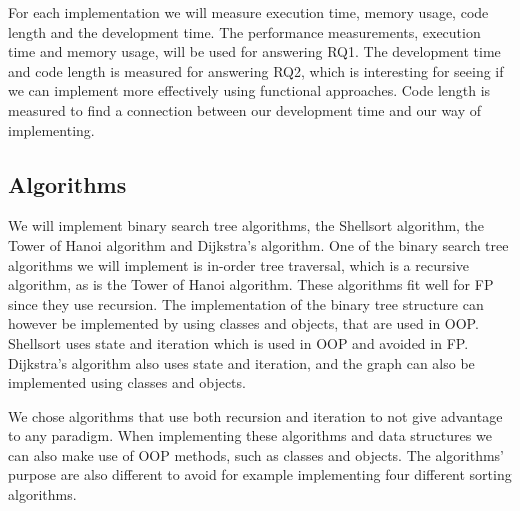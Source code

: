 \documentclass {article}
\begin{document}
For each implementation we will measure execution time, memory usage, code length and the development time. The performance measurements, execution time and memory usage, will be used for answering RQ1. The development time and code length is measured for answering RQ2, which is interesting for seeing if we can implement more effectively using functional approaches. Code length is measured to find a connection between our development time and our way of implementing.
\subsection{Algorithms}
We will implement binary search tree algorithms, the Shellsort algorithm, the Tower of Hanoi algorithm and Dijkstra's algorithm. One of the binary search tree algorithms we will implement is in-order tree traversal, which is a recursive algorithm, as is the Tower of Hanoi algorithm. These algorithms fit well for FP since they use recursion. The implementation of the binary tree structure can however be implemented by using classes and objects, that are used in OOP. Shellsort uses state and iteration which is used in OOP and avoided in FP. Dijkstra's algorithm also uses state and iteration, and the graph can also be implemented using classes and objects.
 
We chose algorithms that use both recursion and iteration to not give advantage to any paradigm. When implementing these algorithms and data structures we can also make use of OOP methods, such as classes and objects. The algorithms' purpose are also different to avoid for example implementing four different sorting algorithms. 
\end{document}
